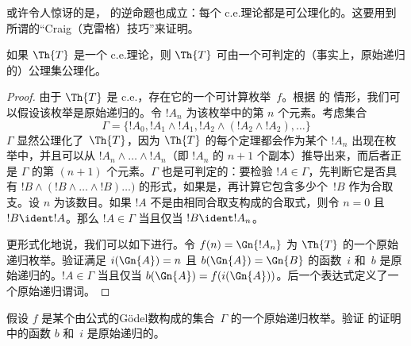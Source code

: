 \documentclass[../OpenLogic/include/open-logic-section]{subfiles}
\begin{document}
或许令人惊讶的是， 的逆命题也成立：每个 c.e.\@ 理论都是可公理化的。这要用到所谓的“Craig（克雷格）技巧”来证明。

\begin{prop}
如果 $\Th{T}$ 是一个 c.e.\@ 理论，则 $\Th{T}$ 可由一个可判定的（事实上，原始递归的）公理集公理化。
\end{prop}

\begin{proof}
  由于 $\Th{T}$ 是 c.e.\@，存在它的一个可计算枚举~$f$。根据  的  情形，我们可以假设该枚举是原始递归的。令 $!A_n$ 为该枚举中的第 $n$ 个元素。考虑集合
  \[
  \Gamma = \{!A_0, !A_1 \land !A_1, !A_2 \land (!A_2 \land !A_2), \dots\}
  \]
  $\Gamma$ 显然公理化了~$\Th{T}$，因为 $\Th{T}$ 的每个定理都会作为某个 $!A_n$ 出现在枚举中，并且可以从 $!A_n \land \dots \land !A_n$（即 $!A_n$ 的 $n+1$ 个副本）推导出来，而后者正是 $\Gamma$ 的第 $(n+1)$ 个元素。$\Gamma$ 也是可判定的：要检验 $!A \in \Gamma$，先判断它是否具有 $!B \land
  (!B \land \dots \land !B)\dots)$ 的形式，如果是，再计算它包含多少个~$!B$ 作为合取支。设 $n$ 为该数目。如果 $!A$ 不是由相同合取支构成的合取式，则令 $n=0$ 且 $!B \ident !A$。那么 $!A \in \Gamma$ 当且仅当 $!B \ident !A_{n}$。

  更形式化地说，我们可以如下进行。令 $f(n) = \Gn{!A_n}$ 为 $\Th{T}$ 的一个原始递归枚举。验证满足 $i(\Gn{A}) = n$ 且 $b(\Gn{A}) =
  \Gn{B}$ 的函数~$i$ 和~$b$ 是原始递归的。$!A \in \Gamma$ 当且仅当 $b(\Gn{A}) =
  f(i(\Gn{A}))$。后一个表达式定义了一个原始递归谓词。
\end{proof}

\begin{prob}
  假设 $f$ 是某个由公式的Gödel数构成的集合~$\Gamma$ 的一个原始递归枚举。验证  的证明中的函数 $b$ 和~$i$ 是原始递归的。
\end{prob}
\end{document}
